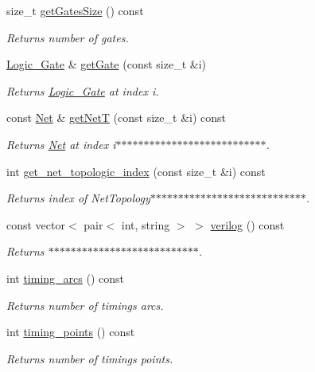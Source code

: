 \begin{DoxyCompactItemize}
size\-\_\-t \hyperlink{classCircuit__Netlist_aa0abd4b9e4a774c8baf83a5b1c141e67}{get\-Gates\-Size} () const 
\begin{DoxyCompactList}\small\item\em Returns number of gates. \end{DoxyCompactList}\item 
\hyperlink{structCircuit__Netlist_1_1Logic__Gate}{Logic\-\_\-\-Gate} \& \hyperlink{classCircuit__Netlist_a2c7c0bc6951c71564f8158682678d118}{get\-Gate} (const size\-\_\-t \&i)
\begin{DoxyCompactList}\small\item\em Returns \hyperlink{structCircuit__Netlist_1_1Logic__Gate}{Logic\-\_\-\-Gate} at index i. \end{DoxyCompactList}\item 
const \hyperlink{structCircuit__Netlist_1_1Net}{Net} \& \hyperlink{classCircuit__Netlist_a9dfc3ea50ca3a6f87ffac564011b85e2}{get\-Net\-T} (const size\-\_\-t \&i) const 
\begin{DoxyCompactList}\small\item\em Returns \hyperlink{structCircuit__Netlist_1_1Net}{Net} at index i$\ast$$\ast$$\ast$$\ast$$\ast$$\ast$$\ast$$\ast$$\ast$$\ast$$\ast$$\ast$$\ast$$\ast$$\ast$$\ast$$\ast$$\ast$$\ast$$\ast$$\ast$$\ast$$\ast$$\ast$$\ast$$\ast$$\ast$. \end{DoxyCompactList}\item 
int \hyperlink{classCircuit__Netlist_a92fd5d0cfc1c5951b5ff1f31dfff2f05}{get\-\_\-net\-\_\-topologic\-\_\-index} (const size\-\_\-t \&i) const 
\begin{DoxyCompactList}\small\item\em Returns index of Net\-Topology$\ast$$\ast$$\ast$$\ast$$\ast$$\ast$$\ast$$\ast$$\ast$$\ast$$\ast$$\ast$$\ast$$\ast$$\ast$$\ast$$\ast$$\ast$$\ast$$\ast$$\ast$$\ast$$\ast$$\ast$$\ast$$\ast$$\ast$$\ast$. \end{DoxyCompactList}\item 
const vector$<$ pair$<$ int, string $>$ $>$ \hyperlink{classCircuit__Netlist_a4638908b9a2c640b61f534edf048cdf7}{verilog} () const 
\begin{DoxyCompactList}\small\item\em Returns $\ast$$\ast$$\ast$$\ast$$\ast$$\ast$$\ast$$\ast$$\ast$$\ast$$\ast$$\ast$$\ast$$\ast$$\ast$$\ast$$\ast$$\ast$$\ast$$\ast$$\ast$$\ast$$\ast$$\ast$$\ast$$\ast$$\ast$. \end{DoxyCompactList}\item 
int \hyperlink{classCircuit__Netlist_a8ada85e3c30b4787a46c7b8396cf640a}{timing\-\_\-arcs} () const 
\begin{DoxyCompactList}\small\item\em Returns number of timings arcs. \end{DoxyCompactList}\item 
int \hyperlink{classCircuit__Netlist_a070452269f2c7109f6ca089ae34dd752}{timing\-\_\-points} () const 
\begin{DoxyCompactList}\small\item\em Returns number of timings points. \end{DoxyCompactList}\end{DoxyCompactItemize}
